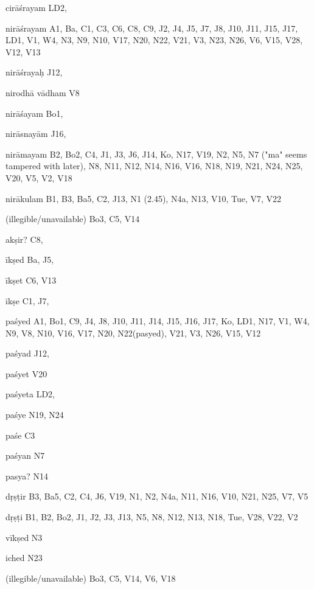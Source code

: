 \begin{ekdosis}
\begin{marma}[hp01_055]
\begin{marma}[hp02_009]
\begin{marma}[hp02_011]
\begin{marma}[hp02_40b]
\item[cirāśrayam] LD2,
\item[nirāśrayam] A1, Ba, C1, C3, C6, C8, C9, J2, J4, J5, J7, J8, J10, J11, J15, J17, LD1, V1, W4, N3, N9, N10, V17, N20, N22, V21, V3, N23, N26, V6, V15, V28, V12, V13
\item[nirāśrayaḥ] J12,
\item[nirodhā vādham] V8
\item[nirāśayam] Bo1,
\item[nirāsnayām] J16,
\item[nirāmayam] B2, Bo2, C4, J1, J3, J6, J14, Ko, N17, V19, N2, N5, N7 ("ma" seems tampered with later), N8, N11, N12, N14, N16, V16, N18, N19, N21, N24, N25, V20, V5, V2, V18
\item[nirākulam] B1, B3, Ba5, C2, J13, N1 (2.45), N4a, N13, V10, Tue, V7, V22
\item[(illegible/unavailable)] Bo3, C5, V14
 \begin{description}

        \end{description}
\end{marma}

\begin{marma}[hp02_40c]
\item[akṣir?] C8,
\item[īkṣed] Ba, J5, 
\item[īkṣet] C6, V13
\item[īkṣe] C1, J7, 
\item[paśyed] A1, Bo1, C9, J4, J8, J10, J11, J14, J15, J16, J17, Ko, LD1, N17, V1, W4, N9, V8, N10, V16, V17, N20, N22(pasyed), V21, V3, N26, V15, V12
\item[paśyad] J12,
\item[paśyet] V20
\item[paśyeta] LD2,
\item[paśye] N19, N24
\item[paśe] C3
\item[paśyan] N7
\item[pasya?] N14  
\item[dṛṣṭir] B3, Ba5, C2, C4, J6, V19, N1, N2, N4a, N11, N16, V10, N21, N25, V7, V5
\item[dṛṣṭi] B1, B2, Bo2, J1, J2, J3, J13, N5, N8, N12, N13, N18, Tue, V28, V22, V2 
\item[vīkṣed] N3
\item[iched] N23
\item[(illegible/unavailable)] Bo3, C5, V14, V6, V18
 \begin{description}


\end{description}
\end{marma}
\end{marma}
\end{marma}
\end{marma}
\end{ekdosis}
